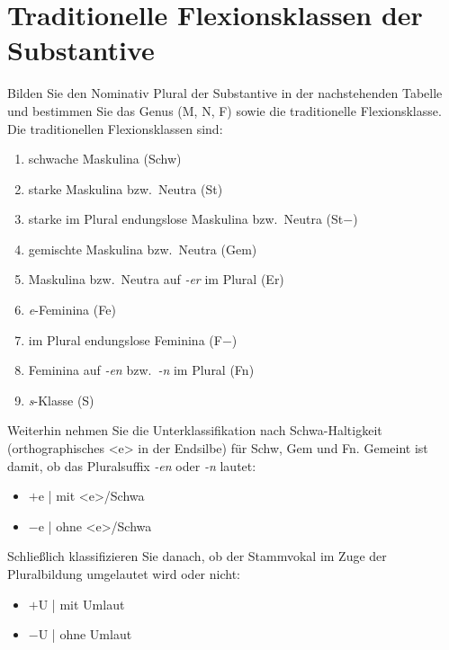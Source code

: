 \section{Traditionelle Flexionsklassen der Substantive}

Bilden Sie den Nominativ Plural der Substantive in der nachstehenden Tabelle und bestimmen Sie das Genus (M, N, F) sowie die traditionelle Flexionsklasse.
Die traditionellen Flexionsklassen sind:

\begin{enumerate}\Lf
  \item schwache Maskulina (Schw) %
  \item starke Maskulina bzw.\ Neutra (St) %
  \item starke im Plural endungslose Maskulina bzw.\ Neutra (St$-$) %
  \item gemischte Maskulina bzw.\ Neutra (Gem) %
  \item Maskulina bzw.\ Neutra auf \textit{-er} im Plural (Er)\footnotemark[1] %
  \item \textit{e}-Feminina (Fe)\footnotemark[1] %
  \item im Plural endungslose Feminina (F$-$)\footnotemark[1] %
  \item Feminina auf \textit{-en} bzw.\ \textit{-n} im Plural (Fn)\footnotemark[2] %
  \item \textit{s}-Klasse (S) %
\end{enumerate}


Weiterhin nehmen Sie die Unterklassifikation nach Schwa-Haltigkeit (orthographisches <e> in der Endsilbe) für Schw, Gem und Fn. Gemeint ist damit, ob das Pluralsuffix \textit{-en} oder \textit{-n} lautet:

\begin{itemize}\Lf
  \item $+$e | mit <e>\slash Schwa
  \item $-$e | ohne <e>\slash Schwa
\end{itemize}

Schließlich klassifizieren Sie danach, ob der Stammvokal im Zuge der Pluralbildung umgelautet wird oder nicht:

\begin{itemize}\Lf
  \item $+$U | mit Umlaut
  \item $-$U | ohne Umlaut
\end{itemize}


